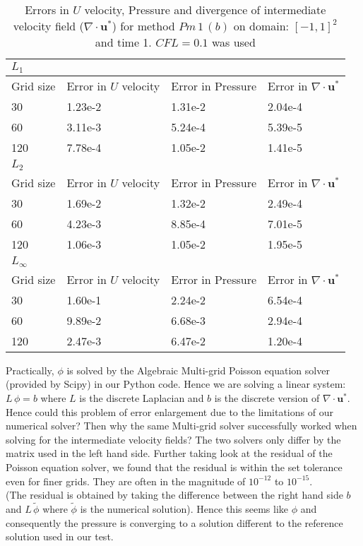 \begin{table}[H]
\centering
\begin{tabular}{|l|l|l|l|}
	\hline
	 $L_1$  \\
	 \hline
	 Grid size & Error in $U$ velocity & Error in Pressure & Error in $\nabla \cdot \textbf{u}^*$\\
	\hline
	30 & 1.23e-2 & 1.31e-2 & 2.04e-4\\
	60 & 3.11e-3 & 5.24e-4 & 5.39e-5\\
	120 & 7.78e-4 & 1.05e-2 & 1.41e-5\\
	\hline
	 $L_2$ \\
	\hline
	Grid size & Error in $U$ velocity & Error in Pressure & Error in $\nabla \cdot \textbf{u}^*$\\
	\hline
	30 & 1.69e-2 & 1.32e-2 & 2.49e-4\\
	60 & 4.23e-3 & 8.85e-4 & 7.01e-5\\
	120 & 1.06e-3& 1.05e-2 & 1.95e-5\\
	\hline
	$L_\infty$\\
	\hline
	Grid size & Error in $U$ velocity & Error in Pressure & Error in $\nabla \cdot \textbf{u}^*$\\
	\hline
	30 & 1.60e-1 & 2.24e-2 & 6.54e-4\\
	60 & 9.89e-2 & 6.68e-3 & 2.94e-4\\
	120 & 2.47e-3& 6.47e-2 & 1.20e-4\\
	\hline
\end{tabular}
\caption{Errors in $U$ velocity, Pressure and divergence of intermediate velocity field ($\nabla \cdot \textbf{u}^*$) for method $Pm\,1\,(b)$ on domain: $[-1,1]^2$ and time 1. $CFL = 0.1$ was used}\label{table:2}
\end{table}

Practically, $\phi$ is solved by the Algebraic Multi-grid Poisson equation solver (provided by Scipy) in our Python code. Hence we are solving a linear system: $L\,\phi = b$ where $L$ is the discrete Laplacian and $b$ is the discrete version of $\nabla \cdot \textbf{u}^*$. Hence could this problem of error enlargement due to the limitations of our numerical solver? Then why the same Multi-grid solver successfully worked when solving for the intermediate velocity fields? The two solvers only differ by the matrix used in the left hand side. Further taking look at the residual of the Poisson equation solver, we found that the residual is within the set tolerance even for finer grids. They are often in the magnitude of $10^{-12}$ to $10^{-15}$.\\
(The residual is obtained by taking the difference between the right hand side $b$ and $L\,\tilde{\phi}$ where $\tilde{\phi}$ is the numerical solution). Hence this seems like $\phi$ and consequently the pressure is converging to a solution different to the reference solution used in our test.\\

